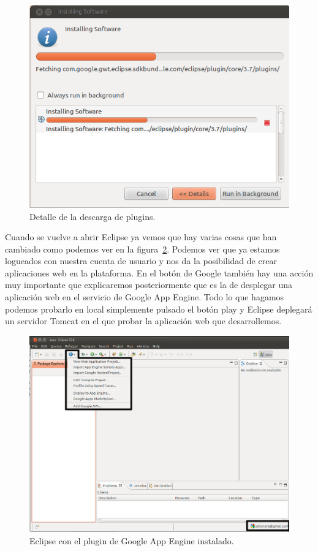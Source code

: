 \begin{figure}[hbt]
  \centering
    \includegraphics[scale=0.6]{./ConfiguracionEclipse/imagenes/instalacionPlugins.png}
  \caption{Detalle de la descarga de plugins.}
  \label{fig:instalacionPlugins}
\end{figure}

Cuando se vuelve a abrir Eclipse ya vemos que hay varias cosas que han cambiado como podemos ver en la figura~\ref{fig:eclipseGAE}. Podemos ver que ya estamos logueados con nuestra cuenta de usuario y nos da la posibilidad de crear aplicaciones web en la plataforma. En el botón de Google también hay una acción muy importante que explicaremos posteriormente que es la de desplegar una aplicación web en el servicio de Google App Engine. Todo lo que hagamos podemos probarlo en local simplemente pulsado el botón play y Eclipse deplegará un servidor Tomcat en el que probar la aplicación web que desarrollemos.

\begin{figure}[hbt]
  \centering
    \includegraphics[scale=0.5]{./ConfiguracionEclipse/imagenes/eclipseGAE.png}
  \caption{Eclipse con el plugin de Google App Engine instalado.}
  \label{fig:eclipseGAE}
\end{figure}

